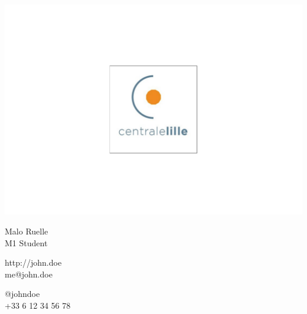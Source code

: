 \documentclass{article}
\begin{document}
\centering \includegraphics[width=.25\linewidth]{logo}\\[5pt]
\parbox{2in}{\Large \centering Malo Ruelle\\[1pt]
\normalsize M1 Student}

\vfill
\raggedright
\begin{multicols}{2}
http://john.doe\\
me@john.doe

\columnbreak
\raggedleft
@johndoe\\
+33 6 12 34 56 78%
\end{multicols}%
\end{document}
